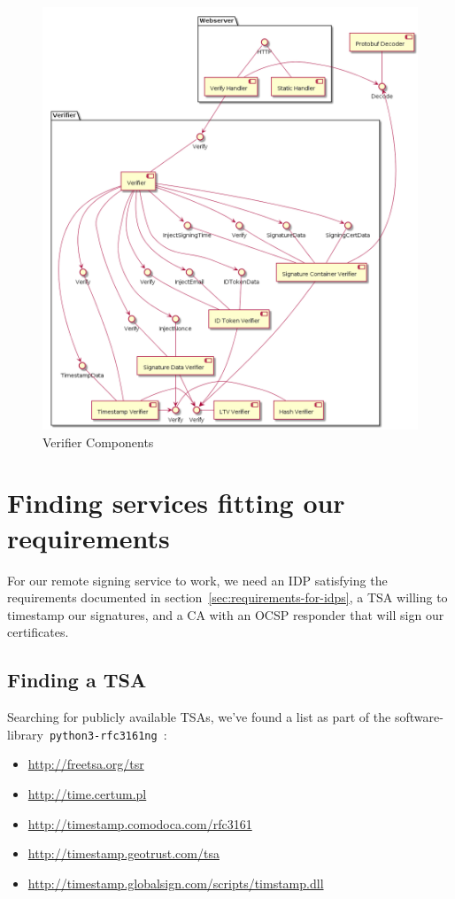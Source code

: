 \begin{figure}[H]
    \begin{center}
        \includegraphics[width=0.7\linewidth]{images/verifier_components.png}
        \caption{Verifier Components}
        \label{fig:verifiercomponents}
    \end{center}
\end{figure}



\section{Finding services fitting our requirements}\label{sec:finding-services-fitting-our-requirements}

For our remote signing service to work,
we need an \gls{IDP} satisfying the requirements documented in section~\ref{sec:requirements-for-idps},
a \gls{TSA} willing to timestamp our signatures,
and a \gls{CA} with an \gls{OCSP} responder that will sign our certificates.

\subsection{Finding a TSA}\label{subsec:finding-a-tsa}
Searching for publicly available \gls{TSA}s, we've found a list as part of the software-library~\texttt{python3-rfc3161ng}~\cite{pythonrfc3161}:
\begin{itemize}
    \item \url{http://freetsa.org/tsr}
    \item \url{http://time.certum.pl}
    \item \url{http://timestamp.comodoca.com/rfc3161}
    \item \url{http://timestamp.geotrust.com/tsa}
    \item \url{http://timestamp.globalsign.com/scripts/timstamp.dll}
\end{itemize}

